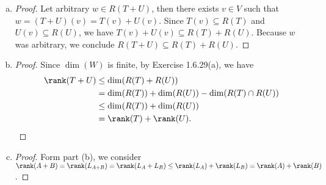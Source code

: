 \begin{Exercise}
\begin{enumerate}[(a)]
\item
\begin{proof}
Let arbitrary $w\in R(T+U)$, then there exists $v\in V$ such that $w=(T+U)(v) = T(v)+U(v)$. Since $T(v) \subseteq R(T)$ and $U(v) \subseteq R(U)$, we have $T(v)+U(v) \subseteq R(T)+R(U)$. Because $w$ was arbitrary, we conclude $R(T+U)\subseteq R(T)+R(U)$.
\end{proof}

\item
\begin{proof}
Since $\dim(W)$ is finite, by Exercise 1.6.29(a), we have
\begin{align*}
\rank(T+U)
&\leq \dim(R(T)+R(U)) \\
&= \dim(R(T)) + \dim(R(U)) - \dim(R(T)\cap R(U)) \\
&\leq \dim(R(T)) + \dim(R(U)) \\
&= \rank(T)+\rank(U).
\end{align*}
\end{proof}

\item
\begin{proof}
Form part (b), we consider $\rank(A+B) = \rank(L_{A+B}) = \rank(L_A+L_B) \leq \rank(L_A) + \rank(L_B) = \rank(A) + \rank(B)$.
\end{proof}

\end{enumerate}
\end{Exercise}